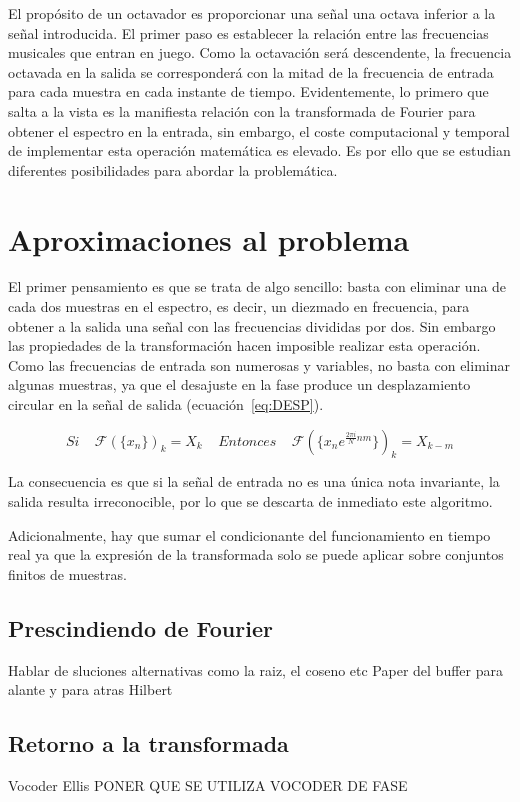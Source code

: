 El propósito de un octavador es proporcionar una señal una octava inferior a la señal introducida. El primer paso es establecer la relación entre las frecuencias musicales que entran en juego. Como la octavación será descendente, la frecuencia octavada en la salida se corresponderá con la mitad de la frecuencia de entrada para cada muestra en cada instante de tiempo.
Evidentemente, lo primero que salta a la vista es la manifiesta relación con la transformada de Fourier para obtener el espectro en la entrada, sin embargo, el coste computacional y temporal de implementar esta operación matemática es elevado. Es por ello que se estudian diferentes posibilidades para abordar la problemática.
\section{Aproximaciones al problema}
El primer pensamiento es que se trata de algo sencillo: basta con eliminar una de cada dos muestras en el espectro, es decir, un diezmado en frecuencia, para obtener a la salida una señal con las frecuencias divididas por dos. Sin embargo las propiedades de la transformación hacen imposible realizar esta operación.
Como las frecuencias de entrada son numerosas y variables, no basta con eliminar algunas muestras, ya que el desajuste en la fase produce un desplazamiento circular en la señal de salida (ecuación~\ref{eq:DESP}). 

\begin{equation}
\label{eq:DESP}
Si~~~~~\mathscr{F}(\{x_{n}\})_{k} = X_{k}~~~~~Entonces~~~~~\mathscr{F}(\{x_{n}e^{\frac{2\pi i}{N}nm}\})_{k}= X_{k-m} 
\end{equation}

La consecuencia es que si la señal de entrada no es una única nota invariante, la salida resulta irreconocible, por lo que se descarta  de inmediato este algoritmo.

Adicionalmente, hay que sumar el condicionante del funcionamiento en tiempo real ya que la expresión de la transformada solo se puede aplicar sobre conjuntos finitos de muestras.

\subsection{Prescindiendo de Fourier}
Hablar de sluciones alternativas como la raiz, el coseno etc
Paper del buffer para alante y para atras
Hilbert
\subsection{Retorno a la transformada}
Vocoder
Ellis
PONER QUE SE UTILIZA VOCODER DE FASE
